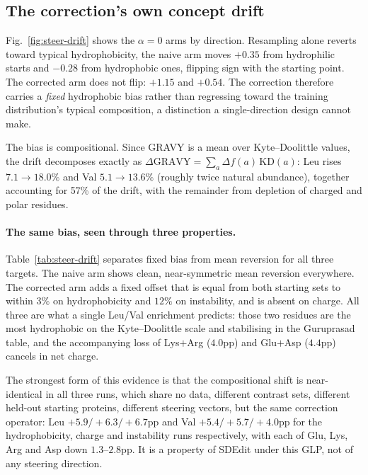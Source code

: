 \documentclass{article}
\begin{document}
\subsection{The correction's own concept drift}
\label{app:steer-drift}

Fig.~\ref{fig:steer-drift} shows the $\alpha{=}0$ arms by direction. Resampling alone
reverts toward typical hydrophobicity, the naive arm moves $+0.35$ from hydrophilic
starts and $-0.28$ from hydrophobic ones, flipping sign with the starting point. The
corrected arm does not flip: $+1.15$ and $+0.54$. The correction therefore carries a
\emph{fixed} hydrophobic bias rather than regressing toward the training distribution's
typical composition, a distinction a single-direction design cannot make.

The bias is compositional. Since GRAVY is a mean over Kyte--Doolittle values, the drift
decomposes exactly as $\Delta\mathrm{GRAVY} = \sum_a \Delta f(a)\,\mathrm{KD}(a)$: Leu rises
$7.1{\to}18.0\%$ and Val $5.1{\to}13.6\%$ (roughly twice natural abundance), together
accounting for 57\% of the drift, with the remainder from depletion of charged and polar
residues.

\paragraph{The same bias, seen through three properties.} Table~\ref{tab:steer-drift}
separates fixed bias from mean reversion for all three targets. The naive arm shows clean,
near-symmetric mean reversion everywhere. The corrected arm adds a fixed offset that is
equal from both starting sets to within $3\%$ on hydrophobicity and $12\%$ on instability,
and is absent on charge. All three are what a single Leu/Val enrichment predicts: those two
residues are the most hydrophobic on the Kyte--Doolittle scale and stabilising in the
Guruprasad table, and the accompanying loss of Lys$+$Arg ($4.0$pp) and Glu$+$Asp ($4.4$pp)
cancels in net charge.

The strongest form of this evidence is that the compositional shift is near-identical in
all three runs, which share no data, different contrast sets, different held-out
starting proteins, different steering vectors, but the same correction operator:
Leu $+5.9/+6.3/+6.7$pp and Val $+5.4/+5.7/+4.0$pp for the hydrophobicity, charge and
instability runs respectively, with each of Glu, Lys, Arg and Asp down $1.3$--$2.8$pp. It
is a property of SDEdit under this GLP, not of any steering direction.
\end{document}
